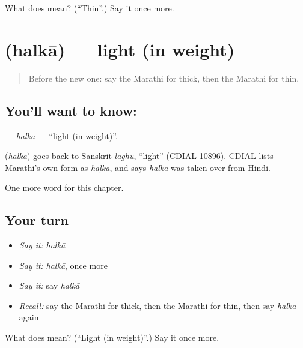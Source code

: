 \begin{tcolorbox}[breakable,colback=teal!4,colframe=teal!35!black,title={Before you move on}]
What does  mean? (\textquotedblleft{}Thin\textquotedblright{}.) Say it once more.
\end{tcolorbox}
\section[\texorpdfstring{\mr{हलका} (halkā)}{हलका (halkā)}]{ (halkā) — light (in weight)}

\label{lesson:MR-C106-halka}



\begin{quote}
Before the new one: say the Marathi for thick, then the Marathi for thin.
\end{quote}

\subsection*{You'll want to know: }
\textbf{} — \emph{halkā} — \textquotedblleft{}light (in weight)\textquotedblright{}.

\begin{cousinweb}
\textbf{} (\emph{halkā}) goes back to Sanskrit \emph{laghu}, \textquotedblleft{}light\textquotedblright{} (CDIAL 10896). CDIAL lists Marathi's own form as \emph{haḷkā}, and says \emph{halkā} was taken over from Hindi.
\end{cousinweb}

\begin{grammarlens}[title={What you've built}]
One more word for this chapter.
\end{grammarlens}

\subsection*{Your turn}
\begin{itemize}
\raggedright
  \item \emph{Say it:} \emph{halkā}
  \item \emph{Say it:} \emph{halkā}, once more
  \item \emph{Say it:} say \emph{halkā}
  \item \emph{Recall:} say the Marathi for thick, then the Marathi for thin, then say \emph{halkā} again
\end{itemize}

\begin{tcolorbox}[breakable,colback=teal!4,colframe=teal!35!black,title={Before you move on}]
What does  mean? (\textquotedblleft{}Light (in weight)\textquotedblright{}.) Say it once more.
\end{tcolorbox}
